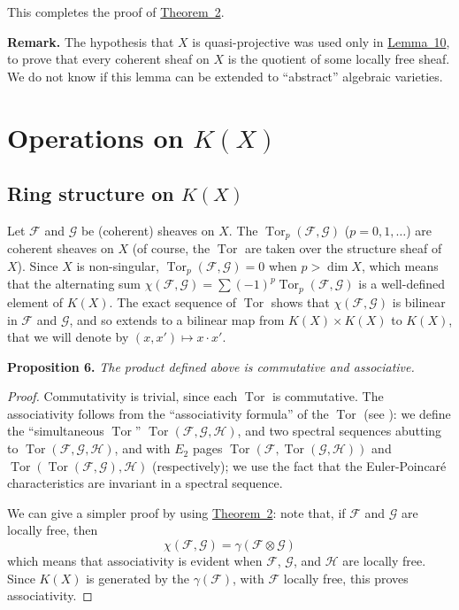\documentclass{article}
\newenvironment{itenv}[1]
  {\phantomsection\par\medskip\noindent\textbf{#1.}\itshape}
  {\medskip}
\newenvironment{rmenv}[1]
  {\phantomsection\par\medskip\noindent\textbf{#1.}\rmfamily}
  {\medskip}
\newcommand{\scr}[1]{{\mathscr{#1}}}
\DeclareMathOperator{\Tor}{Tor}
\newcommand{\oldpage}[1]{\marginpar{\footnotesize$\Big\vert$ \textit{p.~#1}}}
\begin{document}
This completes the proof of \hyperref[theorem2]{Theorem~2}.

\begin{rmenv}{Remark}
  The hypothesis that $X$ is quasi-projective was used only in \hyperref[lemma10]{Lemma~10}, to prove that every coherent sheaf on $X$ is the quotient of some locally free sheaf.
  We do not know if this lemma can be extended to ``abstract'' algebraic varieties.
\end{rmenv}


\section{Operations on \texorpdfstring{$K(X)$}{K(X)}}
\label{section5}

\subsection{Ring structure on \texorpdfstring{$K(X)$}{K(X)}}
\label{subsection5a}

Let $\scr{F}$ and $\scr{G}$ be (coherent) sheaves on $X$.
The $\Tor_p(\scr{F},\scr{G})$ ($p=0,1,\ldots$) are coherent sheaves on $X$ (of course, the $\Tor$
\oldpage{109}
are taken over the structure sheaf of $X$).
Since $X$ is non-singular, $\Tor_p(\scr{F},\scr{G})=0$ when $p>\dim X$, which means that the alternating sum $\chi(\scr{F},\scr{G})=\sum(-1)^p\Tor_p(\scr{F},\scr{G})$ is a well-defined element of $K(X)$.
The exact sequence of $\Tor$ shows that $\chi(\scr{F},\scr{G})$ is bilinear in $\scr{F}$ and $\scr{G}$, and so extends to a bilinear map from $K(X)\times K(X)$ to $K(X)$, that we will denote by $(x,x')\mapsto x\cdot x'$.

\begin{itenv}{Proposition 6}
\label{proposition6}
  The product defined above is commutative and associative.
\end{itenv}

\begin{proof}
  Commutativity is trivial, since each $\Tor$ is commutative.
  The associativity follows from the ``associativity formula'' of the $\Tor$ (see \cite{3}):
  we define the ``simultaneous $\Tor$'' $\Tor(\scr{F},\scr{G},\scr{H})$, and two spectral sequences abutting to $\Tor(\scr{F},\scr{G},\scr{H})$, and with $E_2$ pages $\Tor(\scr{F},\Tor(\scr{G},\scr{H}))$ and $\Tor(\Tor(\scr{F},\scr{G}),\scr{H})$ (respectively);
  we use the fact that the Euler-Poincar\'{e} characteristics are invariant in a spectral sequence.

  We can give a simpler proof by using \hyperref[theorem2]{Theorem~2}:
  note that, if $\scr{F}$ and $\scr{G}$ are locally free, then
  \[
    \chi(\scr{F},\scr{G}) = \gamma(\scr{F}\otimes\scr{G})
  \]
  which means that associativity is evident when $\scr{F}$, $\scr{G}$, and $\scr{H}$ are locally free.
  Since $K(X)$ is generated by the $\gamma(\scr{F})$, with $\scr{F}$ locally free, this proves associativity.
\end{proof}
\end{document}
